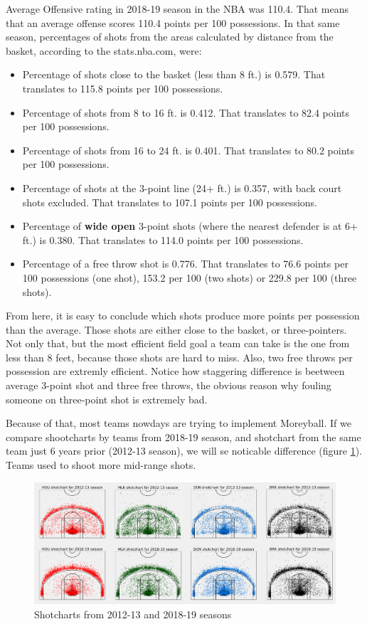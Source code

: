 \documentclass[a4paper]{article}
\begin{document}
Average Offensive rating in 2018-19 season in the NBA was 110.4. That means that an average offense scores 110.4 points per 100 possessions. In that same season, percentages of shots from the areas calculated by distance from the basket, according to the stats.nba.com, were:

\begin{itemize}
	\item Percentage of shots close to the basket (less than 8 ft.) is 0.579. That translates to 115.8 points per 100 possessions.
	\item Percentage of shots from 8 to 16 ft. is 0.412. That translates to 82.4 points per 100 possessions.
	\item Percentage of shots from 16 to 24 ft. is 0.401. That translates to 80.2 points per 100 possessions.
	\item Percentage of shots at the 3-point line (24+ ft.) is 0.357, with back court shots excluded. That translates to 107.1 points per 100 possessions.
	\item Percentage of \textbf{wide open} 3-point shots (where the nearest defender is at 6+ ft.) is 0.380. That translates to 114.0 points per 100 possessions.
	\item Percentage of a free throw shot is 0.776. That translates to 76.6 points per 100 possessions (one shot), 153.2 per 100 (two shots) or 229.8 per 100 (three shots).
\end{itemize}

From here, it is easy to conclude which shots produce more points per possession than the average. Those shots are either close to the basket, or three-pointers. Not only that, but the most efficient field goal a team can take is the one from less than 8 feet, because those shots are hard to miss. Also, two free throws per possession are extremly efficient. Notice how staggering difference is beetween average 3-point shot and three free throws, the obvious reason why fouling someone on three-point shot is extremely bad.

Because of that, most teams nowdays are trying to implement Moreyball. If we compare shootcharts by teams from 2018-19 season, and shotchart from the same team just 6 years prior (2012-13 season), we will se noticable difference (figure \ref{plt:shotcharts}). Teams used to shoot more mid-range shots.

\begin{figure}[h!]
\begin{center}
\includegraphics[scale=0.27]{shotcharts.png}
\end{center}
\caption{Shotcharts from 2012-13 and 2018-19 seasons}
\label{plt:shotcharts}
\end{figure}
\end{document}
